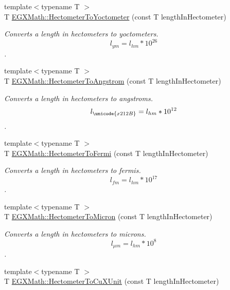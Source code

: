 \begin{DoxyCompactItemize}
{\footnotesize template$<$typename T $>$ }\\T \mbox{\hyperlink{group___e_g_x_math-_conversions-_length_conversions-_s_i-_hectometer-_s_i_ga64c07f341a87b8ebd6a7c10129e3a924}{E\+G\+X\+Math\+::\+Hectometer\+To\+Yoctometer}} (const T length\+In\+Hectometer)
\begin{DoxyCompactList}\small\item\em Converts a length in hectometers to yoctometers. \[ l_{ym}=l_{hm} * 10^{26} \]. \end{DoxyCompactList}\item 
{\footnotesize template$<$typename T $>$ }\\T \mbox{\hyperlink{group___e_g_x_math-_conversions-_length_conversions-_s_i-_hectometer-_non-_s_i_gad1296c0169aa8a99802a30b65a2ea516}{E\+G\+X\+Math\+::\+Hectometer\+To\+Angstrom}} (const T length\+In\+Hectometer)
\begin{DoxyCompactList}\small\item\em Converts a length in hectometers to angstroms. \[ l_{\unicode{x212B}}=l_{hm} * 10^{12} \]. \end{DoxyCompactList}\item 
{\footnotesize template$<$typename T $>$ }\\T \mbox{\hyperlink{group___e_g_x_math-_conversions-_length_conversions-_s_i-_hectometer-_non-_s_i_gabd26977f3d5ad9d0560afb10be63a598}{E\+G\+X\+Math\+::\+Hectometer\+To\+Fermi}} (const T length\+In\+Hectometer)
\begin{DoxyCompactList}\small\item\em Converts a length in hectometers to fermis. \[ l_{fm}=l_{hm} * 10^{17} \]. \end{DoxyCompactList}\item 
{\footnotesize template$<$typename T $>$ }\\T \mbox{\hyperlink{group___e_g_x_math-_conversions-_length_conversions-_s_i-_hectometer-_non-_s_i_ga997feaaeb91fc61c1d87c5d77fb7a665}{E\+G\+X\+Math\+::\+Hectometer\+To\+Micron}} (const T length\+In\+Hectometer)
\begin{DoxyCompactList}\small\item\em Converts a length in hectometers to microns. \[ l_{\mu m}=l_{hm} * 10^{8} \]. \end{DoxyCompactList}\item 
{\footnotesize template$<$typename T $>$ }\\T \mbox{\hyperlink{group___e_g_x_math-_conversions-_length_conversions-_s_i-_hectometer-_non-_s_i_ga5c1d570e3bec185a917f3987d45529be}{E\+G\+X\+Math\+::\+Hectometer\+To\+Cu\+X\+Unit}} (const T length\+In\+Hectometer)

\end{DoxyCompactItemize}
